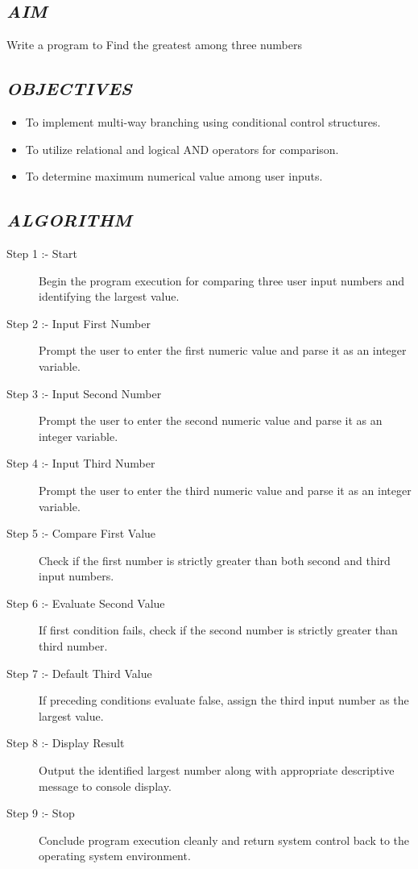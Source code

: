 \documentclass[11pt,a4paper]{article}
\begin{document}
\subsection*{\textit{AIM}}
Write a program to Find the greatest among three numbers

\subsection*{\textit{OBJECTIVES}}
\begin{itemize}
  \item To implement multi-way branching using conditional control structures.
  \item To utilize relational and logical AND operators for comparison.
  \item To determine maximum numerical value among user inputs.
\end{itemize}

\subsection*{\textit{ALGORITHM}}
\begin{description}
  \item[Step 1 :- Start] Begin the program execution for comparing three user input numbers and identifying the largest value.
  \item[Step 2 :- Input First Number] Prompt the user to enter the first numeric value and parse it as an integer variable.
  \item[Step 3 :- Input Second Number] Prompt the user to enter the second numeric value and parse it as an integer variable.
  \item[Step 4 :- Input Third Number] Prompt the user to enter the third numeric value and parse it as an integer variable.
  \item[Step 5 :- Compare First Value] Check if the first number is strictly greater than both second and third input numbers.
  \item[Step 6 :- Evaluate Second Value] If first condition fails, check if the second number is strictly greater than third number.
  \item[Step 7 :- Default Third Value] If preceding conditions evaluate false, assign the third input number as the largest value.
  \item[Step 8 :- Display Result] Output the identified largest number along with appropriate descriptive message to console display.
  \item[Step 9 :- Stop] Conclude program execution cleanly and return system control back to the operating system environment.
\end{description}
\end{document}
